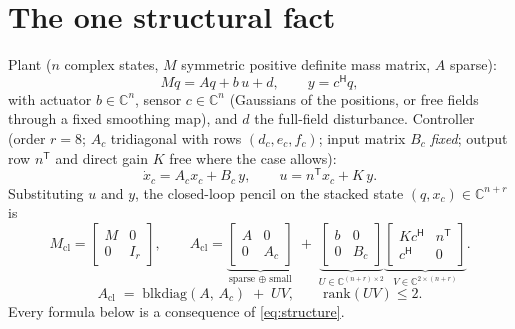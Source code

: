 \documentclass[11pt,a4paper]{article}
\newcommand{\C}{\mathbb{C}}
\newcommand{\Mcl}{M_{\mathrm{cl}}}
\newcommand{\Acl}{A_{\mathrm{cl}}}
\newcommand{\hp}{^{\mathsf H}}
\newcommand{\tp}{^{\mathsf T}}   %
\begin{document}
{%
\section{The one structural fact}\label{sec:structure}
\label{sec:structure}

Plant ($n$ complex states, $M$ symmetric positive definite mass matrix, $A$ sparse):
\[
M\dot q = Aq + b\,u + d,\qquad y = c\hp q,
\]
with actuator $b\in\C^n$, sensor $c\in\C^n$ (Gaussians of the positions, or free fields
through a fixed smoothing map), and $d$ the full-field disturbance.  Controller (order
$r=8$; $A_c$ tridiagonal with rows $(d_c,e_c,f_c)$; input matrix $B_c$ \emph{fixed};
output row $n\tp$ and direct gain $K$ free where the case allows):
\[
\dot x_c = A_c x_c + B_c\, y,\qquad u = n\tp x_c + K\,y .
\]
Substituting $u$ and $y$, the closed-loop pencil on the stacked state
$(q,x_c)\in\C^{n+r}$ is
\[
\Mcl=\begin{bmatrix} M & 0\\ 0 & I_r\end{bmatrix},
\qquad
\Acl=
\underbrace{\begin{bmatrix} A & 0\\ 0 & A_c\end{bmatrix}}_{\text{sparse }\oplus\text{ small}}
\;+\;
\underbrace{\begin{bmatrix} b & 0\\ 0 & B_c\end{bmatrix}}_{U\in\C^{(n+r)\times 2}}
\underbrace{\begin{bmatrix} K c\hp & n\tp\\ c\hp & 0\end{bmatrix}}_{V\in\C^{2\times(n+r)}}.
\]
\begin{equation}
\boxed{\;\Acl \;=\; \mathrm{blkdiag}(A,\,A_c)\;+\;UV,\qquad \mathrm{rank}(UV)\le 2.\;}
\label{eq:structure}
\end{equation}
Every formula below is a consequence of \eqref{eq:structure}.

}
\end{document}
